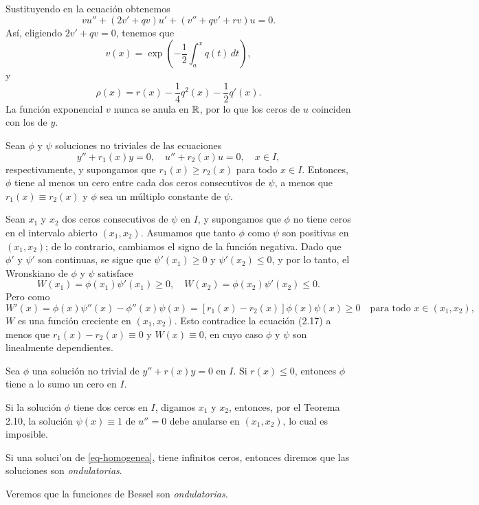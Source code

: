 \documentclass[main.tex]{subfiles}
\begin{document}
Sustituyendo en la ecuación obtenemos
\[
v u'' + (2 v' + q v) u' + (v'' + q v' + r v) u = 0.
\]
Así, eligiendo \( 2 v' + q v = 0 \), tenemos que
\[
v(x) = \exp\left(-\frac{1}{2} \int_a^x q(t) \, dt\right),
\]
y
\[
\rho(x) = r(x) - \frac{1}{4} q^2(x) - \frac{1}{2} q'(x).
\]
La función exponencial \(v\) nunca se anula en \(\mathbb R \), por lo que los ceros de \(u\) coinciden con los de \(y\).
\begin{teorema}
Sean \( \phi \) y \( \psi \) soluciones no triviales de las ecuaciones
\[
y'' + r_1(x) y = 0, \quad u'' + r_2(x) u = 0, \quad x \in I,
\]
respectivamente, y supongamos que \( r_1(x) \geq r_2(x) \) para todo \( x \in I \). Entonces, \( \phi \) tiene al menos un cero entre cada dos ceros consecutivos de \( \psi \), a menos que \( r_1(x) \equiv r_2(x) \) y \( \phi \) sea un múltiplo constante de \( \psi \).
\end{teorema}

\dem Sean \( x_1 \) y \( x_2 \) dos ceros consecutivos de \( \psi \) en \( I \), y supongamos que \( \phi \) no tiene ceros en el intervalo abierto \( (x_1, x_2) \). Asumamos que tanto \( \phi \) como \( \psi \) son positivas en \( (x_1, x_2) \); de lo contrario, cambiamos el signo de la función negativa. Dado que \( \phi' \) y \( \psi' \) son continuas, se sigue que \( \psi'(x_1) \geq 0 \) y \( \psi'(x_2) \leq 0 \), y por lo tanto, el Wronskiano de \( \phi \) y \( \psi \) satisface
\[
W(x_1) = \phi(x_1) \psi'(x_1) \geq 0, \quad W(x_2) = \phi(x_2) \psi'(x_2) \leq 0.
\]
Pero como
\[
W'(x) = \phi(x) \psi''(x) - \phi''(x) \psi(x) = [r_1(x) - r_2(x)] \phi(x) \psi(x) \geq 0 \quad \text{para todo } x \in (x_1, x_2),
\]
\( W \) es una función creciente en \( (x_1, x_2) \). Esto contradice la ecuación (2.17) a menos que \( r_1(x) - r_2(x) \equiv 0 \) y \( W(x) \equiv 0 \), en cuyo caso \( \phi \) y \( \psi \) son linealmente dependientes.
\QED\\
\begin{cor}
Sea \( \phi \) una solución no trivial de \( y'' + r(x) y = 0 \) en \( I \). Si \( r(x) \leq 0 \), entonces \( \phi \) tiene a lo sumo un cero en \( I \).
\end{cor}
\dem Si la solución \( \phi \) tiene dos ceros en \( I \), digamos \( x_1 \) y \( x_2 \), entonces, por el Teorema 2.10, la solución \( \psi(x) \equiv 1 \) de \( u'' = 0 \) debe anularse en \( (x_1, x_2) \), lo cual es imposible.
\begin{def.}
  Si una soluci'on de \ref{eq-homogenea}, tiene infinitos ceros, entonces diremos que las soluciones son \emph{ondulatorias}.
\end{def.}
\obs Veremos que la funciones de Bessel son \emph{ondulatorias}.
\end{document}
